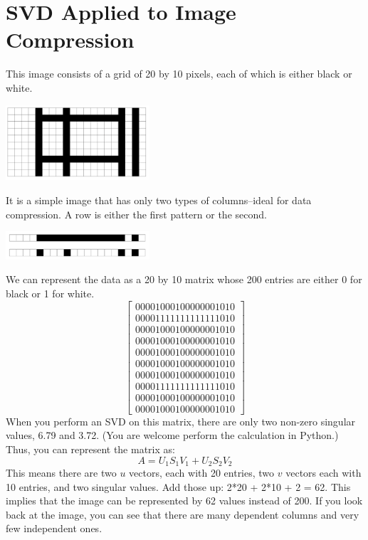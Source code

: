 \section{SVD Applied to Image Compression}
This image consists of a grid of 20 by 10 pixels, each of which is either black or white.

\includegraphics[width=0.4\textwidth]{imagecompress.png}

It is a simple image that has only two types of columns--ideal for data compression. A row is either the first pattern or the second.

\includegraphics[width=0.4\textwidth]{rows.png}

We can represent the data as a 20 by 10 matrix whose 200 entries are either 0 for black or 1 for white. 
$$
\begin{bmatrix}
0 0 0 0 1 0 0 0 1 0 0 0 0 0 0 0 1 0 1 0\\
0 0 0 0 1 1 1 1 1 1 1 1 1 1 1 1 1 0 1 0\\
0 0 0 0 1 0 0 0 1 0 0 0 0 0 0 0 1 0 1 0\\
0 0 0 0 1 0 0 0 1 0 0 0 0 0 0 0 1 0 1 0\\
0 0 0 0 1 0 0 0 1 0 0 0 0 0 0 0 1 0 1 0\\
0 0 0 0 1 0 0 0 1 0 0 0 0 0 0 0 1 0 1 0\\
0 0 0 0 1 0 0 0 1 0 0 0 0 0 0 0 1 0 1 0\\
0 0 0 0 1 1 1 1 1 1 1 1 1 1 1 1 1 0 1 0\\
0 0 0 0 1 0 0 0 1 0 0 0 0 0 0 0 1 0 1 0\\
0 0 0 0 1 0 0 0 1 0 0 0 0 0 0 0 1 0 1 0
\end{bmatrix}
$$
When you perform an SVD on this matrix, there are only two non-zero singular values, 6.79 and 3.72. (You are welcome perform the calculation in Python.) Thus, you can represent the matrix as:
$$
A = U_1 S_1 V_1 + U_2 S_2 V_2
$$
This means there are two $u$ vectors, each with 20 entries, two $v$ vectors each with 10 entries, and two singular values. Add those up: 2*20 + 2*10 + 2 = 62. This implies that the image can be represented by 62 values instead of 200. If you look back at the image, you can see that there are many dependent columns and very few independent ones. 

